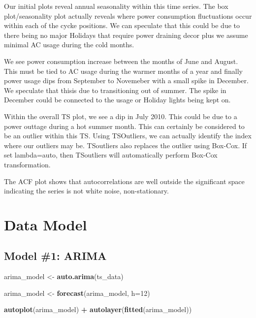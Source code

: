 \documentclass[openany]{book}
\newenvironment{Shaded}{\begin{snugshade}}{\end{snugshade}}
\newcommand{\KeywordTok}[1]{\textcolor[rgb]{0.13,0.29,0.53}{\textbf{#1}}}
\newcommand{\DataTypeTok}[1]{\textcolor[rgb]{0.13,0.29,0.53}{#1}}
\newcommand{\DecValTok}[1]{\textcolor[rgb]{0.00,0.00,0.81}{#1}}
\newcommand{\StringTok}[1]{\textcolor[rgb]{0.31,0.60,0.02}{#1}}
\newcommand{\OperatorTok}[1]{\textcolor[rgb]{0.81,0.36,0.00}{\textbf{#1}}}
\newcommand{\NormalTok}[1]{#1}
\begin{document}
Our initial plots reveal annual seasonality within this time series. The
box plot/seasonality plot actually reveals where power consumption
fluctuations occur within each of the cycke positions. We can speculate
that this could be due to there being no major Holidays that require
power draining decor plus we assume minimal AC usage during the cold
months.

We see power consumption increase between the months of June and August.
This must be tied to AC usage during the warmer months of a year and
finally power usage dips from September to Novemeber with a small spike
in December. We speculate that thisis due to transitioning out of
summer. The spike in December could be connected to the usage or Holiday
lights being kept on.

Within the overall TS plot, we see a dip in July 2010. This could be due
to a power outtage during a hot summer month. This can certainly be
considered to be an outlier within this TS. Using TSOutliers, we can
actually identify the index where our outliers may be. TSoutliers also
replaces the outlier using Box-Cox. If set lambda=auto, then TSoutliers
will automatically perform Box-Cox transformation.

The ACF plot shows that autocorrelations are well outside the
significant space indicating the series is not white noise,
non-stationary.

\section*{Data Model}\label{b-model}

\subsection{Model \#1: ARIMA}\label{model-1-arima}

\begin{Shaded}
\begin{Highlighting}[]
\NormalTok{arima_model <-}\StringTok{ }\KeywordTok{auto.arima}\NormalTok{(ts_data)}

\NormalTok{arima_model <-}\StringTok{ }\KeywordTok{forecast}\NormalTok{(arima_model, }\DataTypeTok{h=}\DecValTok{12}\NormalTok{)}

\KeywordTok{autoplot}\NormalTok{(arima_model) }\OperatorTok{+}\StringTok{ }\KeywordTok{autolayer}\NormalTok{(}\KeywordTok{fitted}\NormalTok{(arima_model))}
\end{Highlighting}
\end{Shaded}
\end{document}
